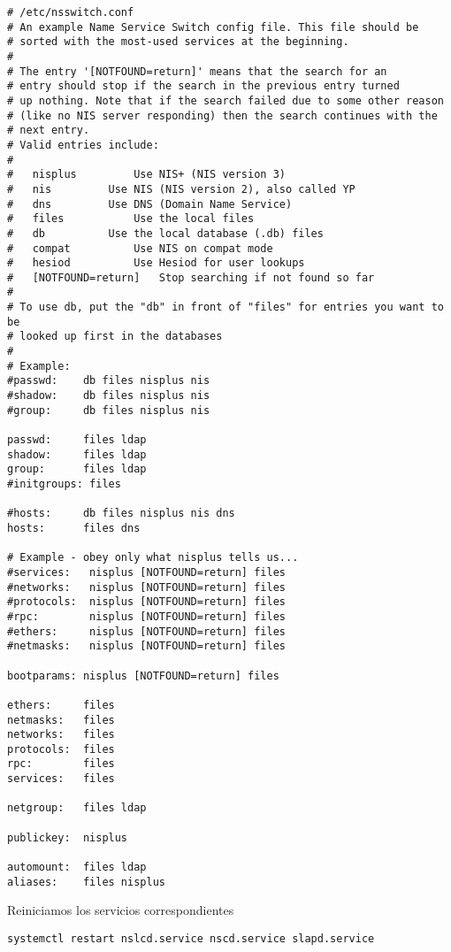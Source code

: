 \begin{lstlisting} 
# /etc/nsswitch.conf
# An example Name Service Switch config file. This file should be
# sorted with the most-used services at the beginning.
#
# The entry '[NOTFOUND=return]' means that the search for an
# entry should stop if the search in the previous entry turned
# up nothing. Note that if the search failed due to some other reason
# (like no NIS server responding) then the search continues with the
# next entry.
# Valid entries include:
#
#	nisplus			Use NIS+ (NIS version 3)
#	nis			Use NIS (NIS version 2), also called YP
#	dns			Use DNS (Domain Name Service)
#	files			Use the local files
#	db			Use the local database (.db) files
#	compat			Use NIS on compat mode
#	hesiod			Use Hesiod for user lookups
#	[NOTFOUND=return]	Stop searching if not found so far
#
# To use db, put the "db" in front of "files" for entries you want to be
# looked up first in the databases
#
# Example:
#passwd:    db files nisplus nis
#shadow:    db files nisplus nis
#group:     db files nisplus nis

passwd:     files ldap
shadow:     files ldap
group:      files ldap
#initgroups: files

#hosts:     db files nisplus nis dns
hosts:      files dns

# Example - obey only what nisplus tells us...
#services:   nisplus [NOTFOUND=return] files
#networks:   nisplus [NOTFOUND=return] files
#protocols:  nisplus [NOTFOUND=return] files
#rpc:        nisplus [NOTFOUND=return] files
#ethers:     nisplus [NOTFOUND=return] files
#netmasks:   nisplus [NOTFOUND=return] files     

bootparams: nisplus [NOTFOUND=return] files

ethers:     files
netmasks:   files
networks:   files
protocols:  files
rpc:        files
services:   files

netgroup:   files ldap

publickey:  nisplus

automount:  files ldap
aliases:    files nisplus
\end{lstlisting}
Reiniciamos los servicios correspondientes
\begin{lstlisting} 
systemctl restart nslcd.service nscd.service slapd.service
\end{lstlisting}
